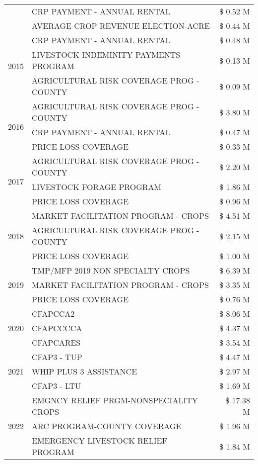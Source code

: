 \begin{tabular}{llr}
 & CRP PAYMENT - ANNUAL RENTAL & \$ 0.52 M \\
 & AVERAGE CROP REVENUE ELECTION-ACRE & \$ 0.44 M \\
\cline{1-3}
\multirow[t]{3}{*}{2015} & CRP PAYMENT - ANNUAL RENTAL & \$ 0.48 M \\
 & LIVESTOCK INDEMINITY PAYMENTS PROGRAM & \$ 0.13 M \\
 & AGRICULTURAL RISK COVERAGE PROG - COUNTY & \$ 0.09 M \\
\cline{1-3}
\multirow[t]{3}{*}{2016} & AGRICULTURAL RISK COVERAGE PROG - COUNTY & \$ 3.80 M \\
 & CRP PAYMENT - ANNUAL RENTAL & \$ 0.47 M \\
 & PRICE LOSS COVERAGE & \$ 0.33 M \\
\cline{1-3}
\multirow[t]{3}{*}{2017} & AGRICULTURAL RISK COVERAGE PROG - COUNTY & \$ 2.20 M \\
 & LIVESTOCK FORAGE PROGRAM & \$ 1.86 M \\
 & PRICE LOSS COVERAGE & \$ 0.96 M \\
\cline{1-3}
\multirow[t]{3}{*}{2018} & MARKET FACILITATION PROGRAM - CROPS & \$ 4.51 M \\
 & AGRICULTURAL RISK COVERAGE PROG - COUNTY & \$ 2.15 M \\
 & PRICE LOSS COVERAGE & \$ 1.00 M \\
\cline{1-3}
\multirow[t]{3}{*}{2019} & TMP/MFP 2019 NON SPECIALTY CROPS & \$ 6.39 M \\
 & MARKET FACILITATION PROGRAM - CROPS & \$ 3.35 M \\
 & PRICE LOSS COVERAGE & \$ 0.76 M \\
\cline{1-3}
\multirow[t]{3}{*}{2020} & CFAPCCA2 & \$ 8.06 M \\
 & CFAPCCCCA & \$ 4.37 M \\
 & CFAPCARES & \$ 3.54 M \\
\cline{1-3}
\multirow[t]{3}{*}{2021} & CFAP3 - TUP & \$ 4.47 M \\
 & WHIP PLUS 3 ASSISTANCE & \$ 2.97 M \\
 & CFAP3 - LTU & \$ 1.69 M \\
\cline{1-3}
\multirow[t]{3}{*}{2022} & EMGNCY RELIEF PRGM-NONSPECIALITY CROPS & \$ 17.38 M \\
 & ARC PROGRAM-COUNTY COVERAGE & \$ 1.96 M \\
 & EMERGENCY LIVESTOCK RELIEF PROGRAM & \$ 1.84 M \\
\cline{1-3}
\bottomrule
\end{tabular}
